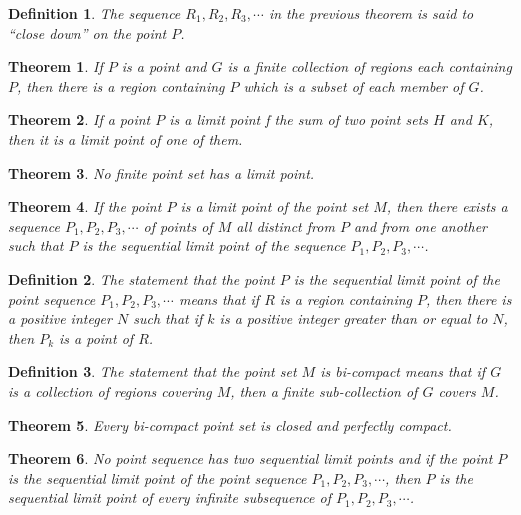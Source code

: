 \documentclass[10pt]{report}
\newtheorem{theorem}{Theorem}
\newtheorem{definition}{Definition}
\begin{document}
\begin{definition}
 The sequence $R_1,R_2,R_3,\cdots$ in the previous theorem is said to ``close down'' on the point
$P$.
\end{definition}

\begin{theorem}
 If $P$ is a point and $G$ is a finite collection of regions each containing $P$, then there is a
region containing $P$ which is a subset of each member of $G$.
\end{theorem}

\begin{theorem}
 If a point $P$ is a limit point f the sum of two point sets $H$ and $K$, then it is a limit point of
one of them.
\end{theorem}

\begin{theorem}
 No finite point set has a limit point.
\end{theorem}

\begin{theorem}
 If the point $P$ is a limit point of the point set $M$, then there exists a sequence
$P_1,P_2,P_3,\cdots$ of points of $M$ all distinct from $P$ and from one another such that $P$ is
the sequential limit point of the sequence $P_1,P_2,P_3,\cdots$.
\end{theorem}

\begin{definition}
 The statement that the point $P$ is the sequential limit point of the point sequence
$P_1,P_2,P_3,\cdots$ means that if $R$ is a region containing $P$, then there is a positive integer
$N$ such that if $k$ is a positive integer greater than or equal to $N$, then $P_k$ is a point of
$R$.
\end{definition}

\begin{definition}
 The statement that the point set $M$ is bi-compact means that if $G$ is a collection of regions
covering $M$, then a finite sub-collection of $G$ covers $M$.
\end{definition}

\begin{theorem}
 Every bi-compact point set is closed and perfectly compact.
\end{theorem}

\begin{theorem}
 No point sequence has two sequential limit points and if the point $P$ is the sequential limit
point of the point sequence $P_1,P_2,P_3,\cdots$, then $P$ is the sequential limit point of every
infinite subsequence of $P_1,P_2,P_3,\cdots$.
\end{theorem}
\end{document}
